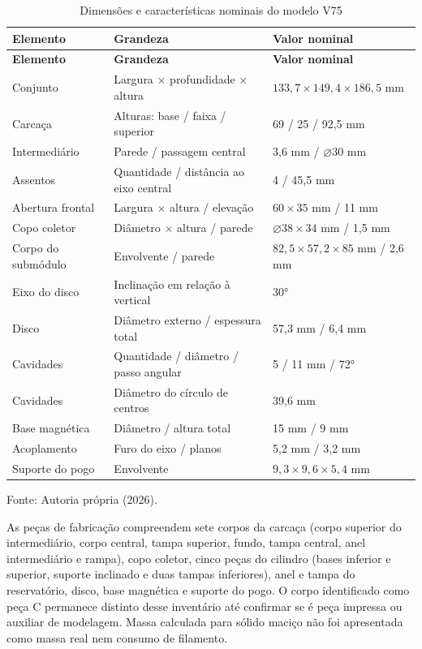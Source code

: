 {\small\setlength{\tabcolsep}{3pt}\begin{longtable}{p{}p{}p{}}
\caption{Dimensões e características nominais do modelo V75}\label{tab:v75-dimensoes}\\
\hline\textbf{Elemento} & \textbf{Grandeza} & \textbf{Valor nominal}\\\hline\endfirsthead
\hline\textbf{Elemento} & \textbf{Grandeza} & \textbf{Valor nominal}\\\hline\endhead
Conjunto & Largura $\times$ profundidade $\times$ altura & $133{,}7\times149{,}4\times186{,}5$ mm\\\hline
Carcaça & Alturas: base / faixa / superior & 69 / 25 / 92,5 mm\\\hline
Intermediário & Parede / passagem central & 3,6 mm / $\varnothing30$ mm\\\hline
Assentos & Quantidade / distância ao eixo central & 4 / 45,5 mm\\\hline
Abertura frontal & Largura $\times$ altura / elevação & $60\times35$ mm / 11 mm\\\hline
Copo coletor & Diâmetro $\times$ altura / parede & $\varnothing38\times34$ mm / 1,5 mm\\\hline
Corpo do submódulo & Envolvente / parede & $82{,}5\times57{,}2\times85$ mm / 2,6 mm\\\hline
Eixo do disco & Inclinação em relação à vertical & 30°\\\hline
Disco & Diâmetro externo / espessura total & 57,3 mm / 6,4 mm\\\hline
Cavidades & Quantidade / diâmetro / passo angular & 5 / 11 mm / 72°\\\hline
Cavidades & Diâmetro do círculo de centros & 39,6 mm\\\hline
Base magnética & Diâmetro / altura total & 15 mm / 9 mm\\\hline
Acoplamento & Furo do eixo / planos & 5,2 mm / 3,2 mm\\\hline
Suporte do pogo & Envolvente & $9{,}3\times9{,}6\times5{,}4$ mm\\\hline
\end{longtable}\noindent Fonte: Autoria própria (2026).\par}

As peças de fabricação compreendem sete corpos da carcaça (corpo superior do intermediário, corpo central, tampa superior, fundo, tampa central, anel intermediário e rampa), copo coletor, cinco peças do cilindro (bases inferior e superior, suporte inclinado e duas tampas inferiores), anel e tampa do reservatório, disco, base magnética e suporte do pogo. O corpo identificado como peça C permanece distinto desse inventário até confirmar se é peça impressa ou auxiliar de modelagem. Massa calculada para sólido maciço não foi apresentada como massa real nem consumo de filamento.

